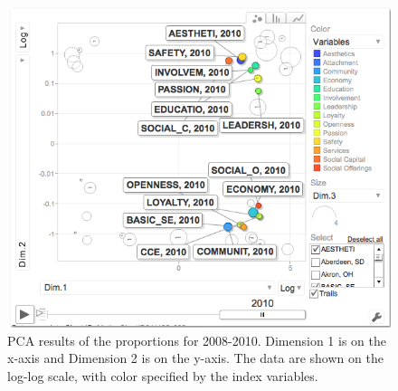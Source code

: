 \documentclass[11pt]{asaproc}
\begin{document}
\begin{figure}[ht]
\begin{framed}
\begin{minipage}[b]{0.45\linewidth}
\end{minipage}
\hspace{0.5cm}
\begin{minipage}[b]{0.45\linewidth}
\centering
\includegraphics[width=\textwidth]{pcaproportions10.png}
\end{minipage}
\hspace{0.5cm}
\begin{minipage}[b]{0.45\linewidth}
\centering
\caption{PCA results of the proportions for 2008-2010. Dimension 1 is on the
x-axis and Dimension 2 is on the y-axis. The data are shown on the
log-log scale, with color specified by the index variables.}
\label{fig:pcaMCproportions}
\end{minipage}
\end{framed}
\end{figure}


\pagebreak
\end{document}
